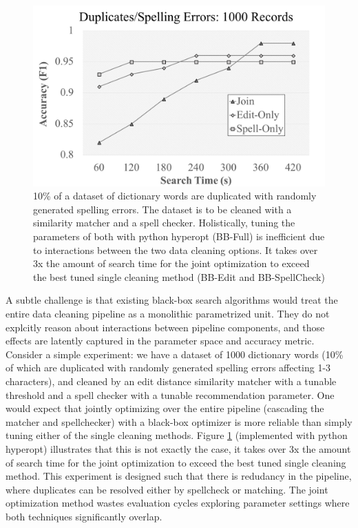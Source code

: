 \begin{figure}[t]
\centering
 \includegraphics[width=0.9\columnwidth]{figures/teaser-experiment.png}
 \caption{\small 10\% of a dataset of dictionary words are duplicated with randomly generated spelling errors. The dataset is to be cleaned with a similarity matcher and a spell checker. Holistically, tuning the parameters of both with \textsf{python hyperopt} (BB-Full) is inefficient due to interactions between the two data cleaning options. It takes over 3x the amount of search time for the joint optimization to exceed the best tuned single cleaning method (BB-Edit and BB-SpellCheck) \label{fig:teaser}}
\end{figure}

A subtle challenge is that existing black-box search algorithms would treat the entire data cleaning pipeline as a monolithic parametrized unit.
They do not explcitly reason about interactions between pipeline components, and those effects are latently captured in the parameter space and accuracy metric.
Consider a simple experiment: we have a dataset of 1000 dictionary words (10\% of which are duplicated with randomly generated spelling errors affecting 1-3 characters), and cleaned by an edit distance similarity matcher with a tunable threshold and a spell checker with a tunable recommendation parameter.
 One would expect that jointly optimizing over the entire pipeline (cascading the matcher and spellchecker) with a black-box optimizer is more reliable than simply tuning either of the single cleaning methods. 
Figure \ref{fig:teaser} (implemented with \textsf{python hyperopt}) illustrates that this is not exactly the case, it takes over 3x the amount of search time for the joint optimization to exceed the best tuned single cleaning method.
This experiment is designed such that there is redudancy in the pipeline, where duplicates can be resolved either by spellcheck or matching.
The joint optimization method wastes evaluation cycles exploring parameter settings where both techniques significantly overlap.


